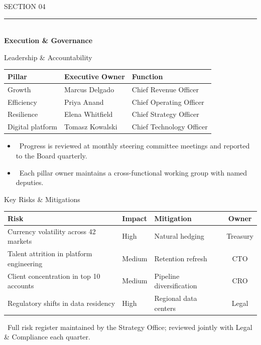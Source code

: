 \documentclass[style=ciment]{powerdot}
\newcommand{\sectiondivider}[2]{%
\begin{slide}{}
\vspace{1.6cm}
\begin{center}
{\Large\textsf{\textcolor{merislate}{#1}}}\\[0.5cm]
{\color{meringold}\rule{4.2cm}{1.6pt}}\\[0.6cm]
{\huge\textbf{\textcolor{merinavy}{#2}}}
\end{center}
\end{slide}}
\begin{document}
\sectiondivider{SECTION 04}{Execution \& Governance}

\begin{slide}{Leadership \& Accountability}
\begin{center}
\renewcommand{\arraystretch}{1.25}
\begin{tabular}{@{}lll@{}}
\toprule
\rowcolor{merilight}
\textbf{Pillar} & \textbf{Executive Owner} & \textbf{Function} \\
\midrule
Growth & Marcus Delgado & Chief Revenue Officer \\
Efficiency & Priya Anand & Chief Operating Officer \\
Resilience & Elena Whitfield & Chief Strategy Officer \\
Digital platform & Tomasz Kowalski & Chief Technology Officer \\
\bottomrule
\end{tabular}
\end{center}
\vspace{0.4cm}
\begin{itemize}
  \item \faCalendar\ Progress is reviewed at monthly steering committee meetings and reported to the Board quarterly.
  \item \faUsers\ Each pillar owner maintains a cross-functional working group with named deputies.
\end{itemize}
\end{slide}

\begin{slide}{Key Risks \& Mitigations}
\begin{center}
\renewcommand{\arraystretch}{1.3}
\begin{tabularx}{\linewidth}{@{}Xllc@{}}
\toprule
\rowcolor{merilight}
\textbf{Risk} & \textbf{Impact} & \textbf{Mitigation} & \textbf{Owner} \\
\midrule
Currency volatility across 42 markets & High & Natural hedging & Treasury \\
Talent attrition in platform engineering & Medium & Retention refresh & CTO \\
Client concentration in top 10 accounts & Medium & Pipeline diversification & CRO \\
Regulatory shifts in data residency & High & Regional data centers & Legal \\
\bottomrule
\end{tabularx}
\end{center}
\vspace{0.4cm}
{\small\textcolor{merislate}{\faFile\ Full risk register maintained by the Strategy Office; reviewed jointly with Legal \& Compliance each quarter.}}
\end{slide}
\end{document}
